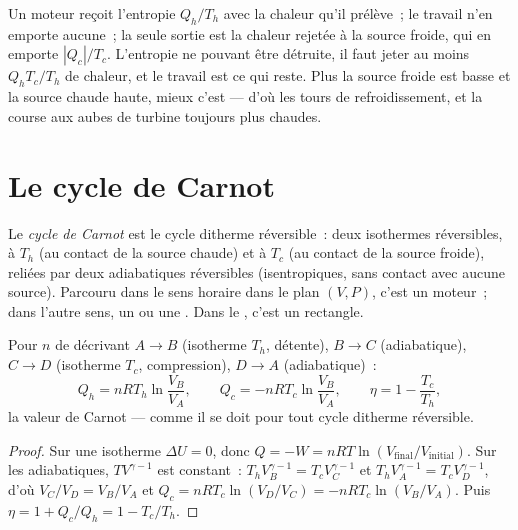 \begin{remark}\label{rem:b1:heat-engines:why}
Un moteur reçoit l'entropie $Q_h/T_h$ avec la chaleur qu'il prélève~; le
travail n'en emporte aucune~; la seule sortie est la chaleur rejetée à la
source froide, qui en emporte $|Q_c|/T_c$. L'entropie ne pouvant être
détruite, il faut jeter au moins $Q_h T_c/T_h$ de chaleur, et le travail est
ce qui reste. Plus la source froide est basse et la source chaude haute,
mieux c'est --- d'où les tours de refroidissement, et la course aux aubes de
turbine toujours plus chaudes.
\end{remark}

\section{Le cycle de Carnot}

\begin{definition}\label{def:b1:heat-engines:carnotcycle}
Le \emph{cycle de Carnot} est le cycle ditherme réversible~: deux isothermes
réversibles, à $T_h$ (au contact de la source chaude) et à $T_c$ (au contact
de la source froide), reliées par deux adiabatiques réversibles
(isentropiques, sans contact avec aucune source). Parcouru dans le sens
horaire dans le plan $(V, P)$, c'est un moteur~; dans l'autre sens, un
 ou une . Dans le , c'est un rectangle.
\end{definition}

\begin{proposition}\label{prop:b1:heat-engines:carnotgas}
Pour $n$  de  décrivant $A \to B$ (isotherme $T_h$,
détente), $B \to C$ (adiabatique), $C \to D$ (isotherme $T_c$,
compression), $D \to A$ (adiabatique)~:
\[
Q_h = nRT_h\ln\frac{V_B}{V_A}, \qquad
Q_c = -nRT_c\ln\frac{V_B}{V_A}, \qquad
\eta = 1 - \frac{T_c}{T_h} ,
\]
la valeur de Carnot --- comme il se doit pour tout cycle ditherme réversible.
\end{proposition}

\begin{proof}
Sur une isotherme $\Delta U = 0$, donc $Q = -W = nRT\ln(V_{\text{final}}/
V_{\text{initial}})$. Sur les adiabatiques, $TV^{\gamma-1}$ est constant~:
$T_hV_B^{\gamma-1} = T_cV_C^{\gamma-1}$ et $T_hV_A^{\gamma-1} =
T_cV_D^{\gamma-1}$, d'où $V_C/V_D = V_B/V_A$ et $Q_c = nRT_c\ln(V_D/V_C) =
-nRT_c\ln(V_B/V_A)$. Puis $\eta = 1 + Q_c/Q_h = 1 - T_c/T_h$.
\end{proof}

